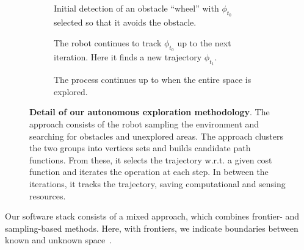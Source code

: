 \documentclass[letterpaper,10pt,conference,twoside]{IEEEtran}
\theoremstyle{definition}
\begin{document}
\begin{figure*}
  \begin{subfigure}[m]{0.33\textwidth}
    \centering
    
    \caption{Initial detection of an obstacle ``wheel'' with $\phi_{t_0}$ selected so that it avoids the obstacle.}
    \label{fig:3-1}
  \end{subfigure}
  \hfill
  \begin{subfigure}[m]{0.32\textwidth}
    \centering
    \hspace*{-.15cm}
    
    \caption{The robot continues to track $\phi_{t_0}$ up to the next iteration. Here it finds a new trajectory $\phi_{t_1}$.}
    \label{fig:3-2}
  \end{subfigure}
  \begin{subfigure}[m]{0.33\textwidth}
    \centering
    \hspace*{.05cm}
    
    \caption{The process continues up to when the entire space is explored.}
    \label{fig:3-3}
  \end{subfigure}
  \caption[Detail of our autonomous exploration methodology]{\textbf{Detail of our autonomous exploration methodology}. The %
  approach consists of the robot sampling the environment and searching for obstacles and unexplored areas. The %
  approach clusters the two groups into vertices sets and builds candidate path functions. From these, it selects the %
  trajectory w.r.t. a given cost function and iterates the operation at each step. In between the iterations, it tracks the trajectory, saving computational and sensing resources.}
  \label{fig:3}
\end{figure*}
\noindent
Our software stack %
consists of a mixed approach, which combines frontier- and sampling-based methods. 
Here, with frontiers, we indicate %
boundaries between known and unknown space~\cite{%
placed2022survey,dang2019graph}.
%
\end{document}
